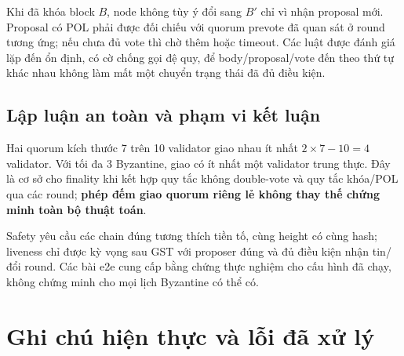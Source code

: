 \documentclass[11pt,a4paper]{article}
\newcommand{\code}[1]{\texttt{\detokenize{#1}}}
\newcommand{\nextpage}{\clearpage}
\begin{document}
Khi đã khóa block $B$, node không tùy ý đổi sang $B'$ chỉ vì nhận proposal mới. Proposal có POL phải được đối chiếu với quorum prevote đã quan sát ở round tương ứng; nếu chưa đủ vote thì chờ thêm hoặc timeout. Các luật \code{_rule_*} được đánh giá lặp đến ổn định, có cờ chống gọi đệ quy, để body/proposal/vote đến theo thứ tự khác nhau không làm mất một chuyển trạng thái đã đủ điều kiện.

\subsection{Lập luận an toàn và phạm vi kết luận}
Hai quorum kích thước 7 trên 10 validator giao nhau ít nhất $2\times7-10=4$ validator. Với tối đa 3 Byzantine, giao có ít nhất một validator trung thực. Đây là cơ sở cho finality khi kết hợp quy tắc không double-vote và quy tắc khóa/POL qua các round; \textbf{phép đếm giao quorum riêng lẻ không thay thế chứng minh toàn bộ thuật toán}.

Safety yêu cầu các chain đúng tương thích tiền tố, cùng height có cùng hash; liveness chỉ được kỳ vọng sau GST với proposer đúng và đủ điều kiện nhận tin/đổi round. Các bài e2e cung cấp bằng chứng thực nghiệm cho cấu hình đã chạy, không chứng minh cho mọi lịch Byzantine có thể có.

\nextpage
\section{Ghi chú hiện thực và lỗi đã xử lý}
\end{document}
